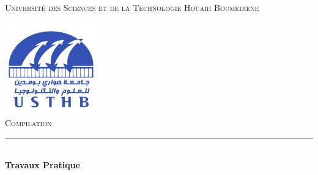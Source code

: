 
\begin{titlepage} %
	\newcommand{\HRule}{\rule{\linewidth}{0.5mm}} %
	
	\center %
	
	
	\baselineskip 
	\textsc{\LARGE Université des Sciences et de la Technologie Houari Boumediene}%

	
	\vfill
	\includegraphics[width=0.3\textwidth]{USTHB_Logo.png}\\[1cm] %
	 
	
	\textsc{\Large Compilation}\\[0.5cm] %
	
	
	\HRule\\[0.4cm]
	\baselineskip 
	{\huge\bfseries Travaux Pratique  \textdegree  \reportnumber \\ \reporttitle}\\[0.4cm] %
	

\end{titlepage}
